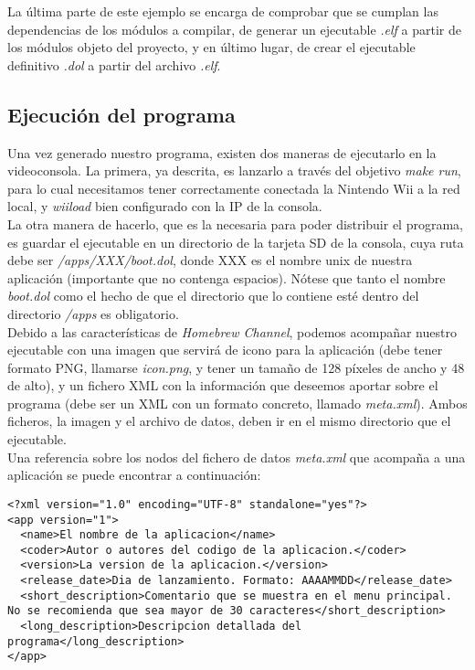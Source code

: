 La última parte de este ejemplo se encarga de comprobar que se cumplan las dependencias de los módulos a compilar, de generar un ejecutable \emph{.elf} a partir de los módulos objeto del proyecto, y en último lugar, de crear el ejecutable definitivo \emph{.dol} a partir del archivo \emph{.elf}.

\subsection{Ejecución del programa}

Una vez generado nuestro programa, existen dos maneras de ejecutarlo en la videoconsola. La primera, ya descrita, es lanzarlo a través del objetivo \emph{make run}, para lo cual necesitamos tener correctamente conectada la Nintendo Wii a la red local, y \emph{wiiload} bien configurado con la IP de la consola. \\

La otra manera de hacerlo, que es la necesaria para poder distribuir el programa, es guardar el ejecutable en un directorio de la tarjeta SD de la consola, cuya ruta debe ser \emph{/apps/XXX/boot.dol}, donde XXX es el nombre unix de nuestra aplicación (importante que no contenga espacios). Nótese que tanto el nombre \emph{boot.dol} como el hecho de que el directorio que lo contiene esté dentro del directorio \emph{/apps} es obligatorio. \\

Debido a las características de \emph{Homebrew Channel}, podemos acompañar nuestro ejecutable con una imagen que servirá de icono para la aplicación (debe tener formato PNG, llamarse \emph{icon.png}, y tener un tamaño de 128 píxeles de ancho y 48 de alto), y un fichero XML con la información que deseemos aportar sobre el programa (debe ser un XML con un formato concreto, llamado \emph{meta.xml}). Ambos ficheros, la imagen y el archivo de datos, deben ir en el mismo directorio que el ejecutable. \\

Una referencia sobre los nodos del fichero de datos \emph{meta.xml} que acompaña a una aplicación se puede encontrar a continuación:

\begin{lstlisting}[style=XML]
<?xml version="1.0" encoding="UTF-8" standalone="yes"?>
<app version="1">
  <name>El nombre de la aplicacion</name>
  <coder>Autor o autores del codigo de la aplicacion.</coder>
  <version>La version de la aplicacion.</version>
  <release_date>Dia de lanzamiento. Formato: AAAAMMDD</release_date>
  <short_description>Comentario que se muestra en el menu principal. No se recomienda que sea mayor de 30 caracteres</short_description>
  <long_description>Descripcion detallada del programa</long_description>
</app>
\end{lstlisting}

